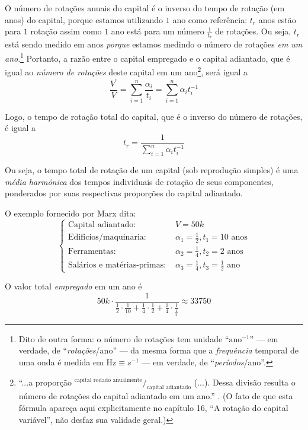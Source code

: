 \documentclass[12pt]{article}
\numberwithin{equation}{section}
\theoremstyle{plain}
\theoremstyle{definition}
\theoremstyle{remark}
\begin{document}
O número de rotações anuais do capital é o inverso do tempo de rotação (em anos) do capital, porque estamos utilizando $1$ ano como referência: $t_{r}$ anos estão para $1$ rotação assim como $1$ ano está para um número $\frac{1}{t_{r}}$ de rotações. Ou seja, $t_{r}$ está sendo medido em anos \textit{porque} estamos medindo o número de rotações \textit{em um ano}.\footnote{Dito de outra forma: o número de rotações tem unidade ``$\text{ano}^{-1}$'' — em verdade, de ``\textit{rotações}/ano'' — da mesma forma que a \textit{frequência} temporal de uma onda é medida em $\text{Hz}\equiv s^{-1}$ — em verdade, de ``\textit{períodos}/ano''.} Portanto, a razão entre o capital empregado e o capital adiantado, que é igual ao \textit{número de rotações} deste capital em um ano\footnote{``...a proporção $^\text{capital rodado anualmente}/_{\text{capital adiantado}}$ (...). Dessa divisão resulta o número de rotações do capital adiantado em um ano.'' \parencite[p. 399]{Marx2014}. (O fato de que esta fórmula apareça aqui explicitamente no capítulo 16, ``A rotação do capital variável'', não desfaz sua validade geral.)}, será igual a
$$
\frac{V^\prime}{V} = \sum \limits_{i=1}^{n} \frac{\alpha_{i}}{t_{i}} = \sum \limits_{i=1}^{n} \alpha_{i} t_{i}^{-1}
$$

Logo, o tempo de rotação total do capital, que é o inverso do número de rotações, é igual a
$$
t_{r} = \frac{1}{\sum \limits_{i=1}^{n} \alpha_{i} t_{i}^{-1}}
$$

Ou seja, o tempo total de rotação de um capital (sob reprodução simples) é uma \textit{média harmônica} dos tempos individuais de rotação de seus componentes, ponderados por suas respectivas proporções do capital adiantado.

O exemplo fornecido por Marx \parencite[p. 270-1]{Marx2014} dita:
$$
\begin{cases}
\text{Capital adiantado}: &V = 50k\\
\text{Edifícios/maquinaria: }&\alpha_{1}=\frac{1}{2}, t_{1}=10 \text{ anos} \\
\text{Ferramentas: }&\alpha_{2}=\frac{1}{4}, t_{2}=2 \text{ anos}\\
\text{Salários e matérias-primas: }&\alpha_{3}=\frac{1}{4}, t_{3}=\frac{1}{2} \text{ ano}
\end{cases}
$$

O valor total \textit{empregado} em um ano é
$$
50k \cdot \frac{1}{\frac{1}{2}\cdot \frac{1}{10} + \frac{1}{4} \cdot \frac{1}{2} + \frac{1}{4} \cdot \frac{1}{\frac{1}{2}}} \approx 33750
$$
\end{document}
